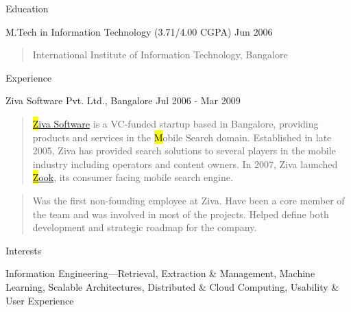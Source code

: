 \documentclass{resume}
\author{Siddhartha Reddy Kothakapu}
\begin{document}
 \maketitle

\begin{category}{Education}{}

    \item {\topic M.Tech in Information Technology}
        {\footnotesize(3.71/4.00 CGPA)}
        {\period Jun 2006}
        \begin{quote}
            International Institute of Information Technology, Bangalore
        \end{quote}

\end{category}


\begin{category}{Experience}{}

    \item {\topic Ziva Software Pvt. Ltd.,} Bangalore
        {\period Jul 2006 - Mar 2009}
        \begin{quote}
            \href{http://www.zook.in/}{{\hl Ziva Software}} is a VC-funded
            startup based in Bangalore, providing products and services in the
            {\hl Mobile Search} domain.  Established in late 2005, Ziva has
            provided search solutions to several players in the mobile industry
            including operators and content owners. In 2007, Ziva launched
            \href{http://www.zook.in/}{{\hl Zook}}, its consumer facing mobile
            search engine.
        \end{quote}
        \begin{quote}
            Was the first non-founding employee at Ziva. Have been a core
            member of the team and was involved in most of the projects. Helped
            define both development and strategic roadmap for the company.
        \end{quote}

\end{category}


\begin{category}{Interests}{}

    \item Information Engineering---Retrieval, Extraction \& Management,
        Machine Learning, Scalable Architectures, Distributed \& Cloud
        Computing, Usability \& User Experience

\end{category}
\end{document}
